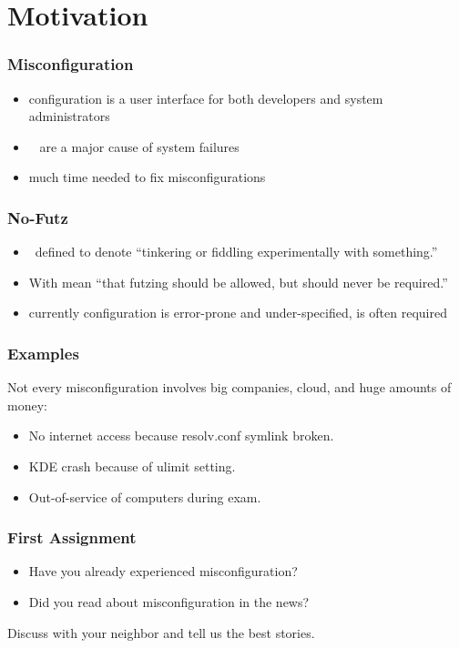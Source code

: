 \documentclass{beamer}
\begin{document}
\section{Motivation}
{
%
\begin{frame}
	\frametitle{Misconfiguration}
	\begin{itemize}
		\item configuration is a user interface for both developers and system administrators
		\item {}~\cite{yin2011empirical,su2007autobash,attariyan2010automating,xu2015systems}
			are a major cause of system failures~\cite{wool2004quantitative,oppenheimer2003internet,pertet2005causes}
		\item much time needed to fix misconfigurations~\cite{rabkin2011static,oppenheimer2003internet,yin2011empirical,mahajan2002bgp}
	\end{itemize}
\end{frame}
\begin{frame}
	\frametitle{No-Futz}
	\begin{itemize}
		\item \citet{holland2001nofutz}~defined  to denote \enquote{tinkering or fiddling experimentally with something.}
		\item With  \citet{holland2001nofutz} mean \enquote{that futzing should be allowed, but should never be required.}
		\item currently configuration is error-prone and under-specified,  is often required
	\end{itemize}
\end{frame}
\begin{frame}
	\frametitle{Examples}
	Not every misconfiguration involves big companies, cloud, and huge amounts of money:
	\begin{itemize}
		\item No internet access because resolv.conf symlink broken.
		\item KDE crash because of ulimit setting.
		\item Out-of-service of computers during exam.
	\end{itemize}
\end{frame}
}
\begin{assignment}
	\frametitle{First Assignment}
	\begin{itemize}
		\item Have you already experienced misconfiguration?
		\item Did you read about misconfiguration in the news?
	\end{itemize}
	\begin{task}
	Discuss with your neighbor and tell us the best stories.
	\end{task}
\end{assignment}
\end{document}
